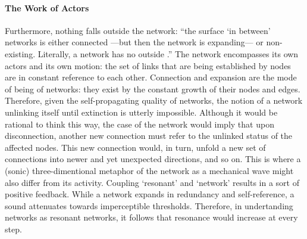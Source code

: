 \paragraph{The Work of Actors}
Furthermore, nothing falls outside the network: ``the surface `in between' networks is either connected ---but then the network is expanding--- or non-existing. Literally, a network has no outside \parencite[6]{Lat90:On}.'' The network encompasses its own actors and its own motion: the set of links that are being established by nodes are in constant reference to each other. Connection and expansion are the mode of being of networks: they exist by the constant growth of their nodes and edges. Therefore, given the self-propagating quality of networks, the notion of a network unlinking itself until extinction is utterly impossible. Although it would be rational to think this way, the case of the network would imply that upon disconnection, another new connection must refer to the unlinked status of the affected nodes. This new connection would, in turn, unfold a new set of connections into newer and yet unexpected directions, and so on. This is where a (sonic) three-dimentional metaphor of the network as a mechanical wave might also differ from its activity. Coupling `resonant' and `network' results in a sort of positive feedback. While a network expands in redundancy and self-reference, a sound attenuates towards imperceptible thresholds. Therefore, in undertanding networks as resonant networks, it follows that resonance would increase at every step. 

